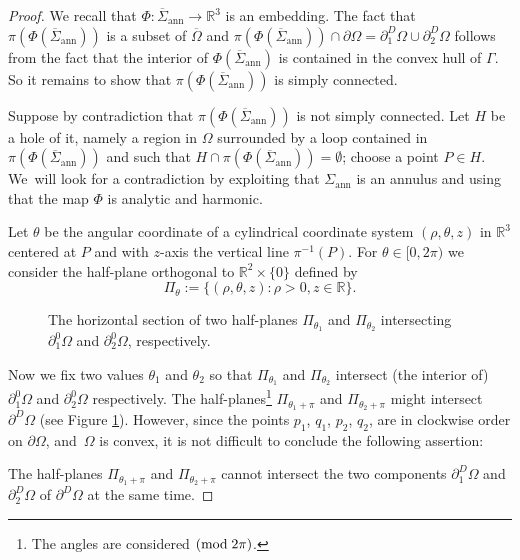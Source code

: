 \documentclass[JEP,XML,SOM,Unicode, NoFloatCountersInSection,published]{cedram}
\newcommand{\R}{\mathbb{R}}
\let\Om\Omega
\newcommand{\openannulus}{\Sigma_\mathrm{ann}}
\newcommand{\immclosedann}{\Phi({\overline\Sigma}_\mathrm{ann})}
\theoremstyle{definition}
\begin{document}
\begin{proof}
We recall that $\Phi:\overline\Sigma_\mathrm{ann}\to \R^3$ is an embedding. The fact that $\pi(\immclosedann)$ is a subset of $\overline\Omega$ and $\pi(\immclosedann)\cap\partial\Om=\partial_1^D\Om\cup\partial_2^D\Om$ follows from the fact that the interior of $\immclosedann$ is contained in the convex hull of $\Gamma$.
So it remains to show that $\pi(\immclosedann)$ is simply connected.

Suppose by contradiction that $\pi(\immclosedann)$ is not simply connected.
Let $H$ be a hole of it, namely a region in $\Om$ surrounded by a loop contained in $\pi(\immclosedann)$ and such that $H\cap
\pi(\immclosedann)=\emptyset$; choose a point $P\in H$. We~will look for a contradiction by exploiting that $\openannulus$ is an annulus and using that the map $\Phi$ is analytic and harmonic.

Let $\theta$ be the angular coordinate of a cylindrical coordinate system $(\rho,\theta,z)$ in $\R^3$ centered at $P$ and with $z$-axis the vertical line $\pi^{-1}(P)$. For $\theta \in [0,2\pi)$ we consider the
half-plane orthogonal to $\R^2\times\{0\}$ defined by
\[
\Pi_\theta:=\{(\rho,\theta,z)\colon\rho>0,z\in\R\}.
\]
\begin{figure}
\begin{center}
\def\svgwidth{0.40\textwidth}

\caption{The horizontal section of
two half-planes $\Pi_{\theta_1}$ and $\Pi_{\theta_2}$ intersecting $\partial^0_1\Om$ and $\partial^0_2\Om$, respectively.
}\label{fig-costruzione}
\end{center}
\end{figure}
Now we fix two values $\theta_1$ and $\theta_2$ so that $\Pi_{\theta_1}$ and $\Pi_{\theta_2}$ intersect (the interior of) $\partial_1^0\Om$ and $\partial_2^0\Om$ respectively. The half-planes\footnote{The angles are considered $(\textup{mod}\; 2\pi)$.} $\Pi_{\theta_1+\pi}$ and $\Pi_{\theta_2+\pi}$ might intersect $\partial^D\Om$ (see Figure \ref{fig-costruzione}). However, since the points $p_1$, $q_1$, $p_2$, $q_2$, are in clockwise order on $\partial \Om$, and~$\Omega$ is convex, it is not difficult to conclude the following assertion:

The half-planes $\Pi_{\theta_1+\pi}$ and $\Pi_{\theta_2+\pi}$ cannot intersect the two components $\partial_1^D\Om$ and $\partial_2^D\Om$ of $\partial^D\Om$ at the same time.


\end{proof}
\end{document}
